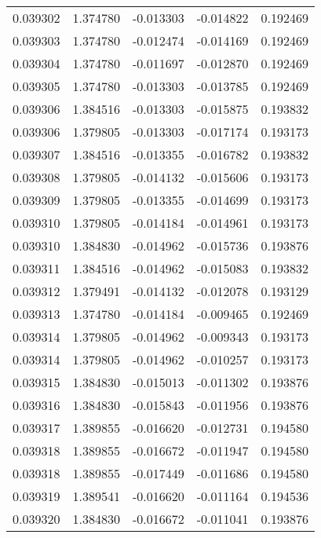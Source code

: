 \begin{tabular}{lrrrr}
0.039302    &  1.374780 & -0.013303 & -0.014822 &             0.192469 \\
0.039303    &  1.374780 & -0.012474 & -0.014169 &             0.192469 \\
0.039304    &  1.374780 & -0.011697 & -0.012870 &             0.192469 \\
0.039305    &  1.374780 & -0.013303 & -0.013785 &             0.192469 \\
0.039306    &  1.384516 & -0.013303 & -0.015875 &             0.193832 \\
0.039306    &  1.379805 & -0.013303 & -0.017174 &             0.193173 \\
0.039307    &  1.384516 & -0.013355 & -0.016782 &             0.193832 \\
0.039308    &  1.379805 & -0.014132 & -0.015606 &             0.193173 \\
0.039309    &  1.379805 & -0.013355 & -0.014699 &             0.193173 \\
0.039310    &  1.379805 & -0.014184 & -0.014961 &             0.193173 \\
0.039310    &  1.384830 & -0.014962 & -0.015736 &             0.193876 \\
0.039311    &  1.384516 & -0.014962 & -0.015083 &             0.193832 \\
0.039312    &  1.379491 & -0.014132 & -0.012078 &             0.193129 \\
0.039313    &  1.374780 & -0.014184 & -0.009465 &             0.192469 \\
0.039314    &  1.379805 & -0.014962 & -0.009343 &             0.193173 \\
0.039314    &  1.379805 & -0.014962 & -0.010257 &             0.193173 \\
0.039315    &  1.384830 & -0.015013 & -0.011302 &             0.193876 \\
0.039316    &  1.384830 & -0.015843 & -0.011956 &             0.193876 \\
0.039317    &  1.389855 & -0.016620 & -0.012731 &             0.194580 \\
0.039318    &  1.389855 & -0.016672 & -0.011947 &             0.194580 \\
0.039318    &  1.389855 & -0.017449 & -0.011686 &             0.194580 \\
0.039319    &  1.389541 & -0.016620 & -0.011164 &             0.194536 \\
0.039320    &  1.384830 & -0.016672 & -0.011041 &             0.193876 \\

\end{tabular}
